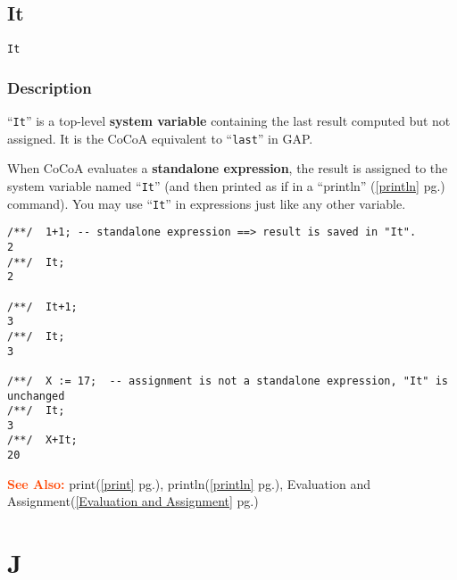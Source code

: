 \documentclass[a4paper]{mybook}
\newenvironment{command}{}{} %
\newcommand\SeeAlso{\par\textcolor{OrangeRed}{\textbf{\large See Also: }}}
\begin{document}
\section{It}
\label{It}
\begin{command} %


\begin{Verbatim}[label=syntax, rulecolor=\color{MidnightBlue},
frame=single]
It
\end{Verbatim}


\subsection*{Description}

``\verb&It&'' is a top-level \textbf{system variable} containing the last result computed
but not assigned.  It is the CoCoA equivalent to ``\verb&last&'' in GAP.
\par 
When CoCoA evaluates a \textbf{standalone expression}, the result is assigned to
the system variable named ``\verb&It&'' (and then printed as if in a ``println'' (\ref{println} pg.\pageref{println})
command).  You may use ``\verb&It&'' in expressions just like any other variable.
\begin{Verbatim}[label=example, rulecolor=\color{PineGreen}, frame=single]
/**/  1+1; -- standalone expression ==> result is saved in "It".
2
/**/  It;
2

/**/  It+1;
3
/**/  It;
3

/**/  X := 17;  -- assignment is not a standalone expression, "It" is unchanged
/**/  It;
3
/**/  X+It;
20
\end{Verbatim}


\SeeAlso %
  print(\ref{print} pg.\pageref{print}), 
    println(\ref{println} pg.\pageref{println}), 
    Evaluation and Assignment(\ref{Evaluation and Assignment} pg.\pageref{Evaluation and Assignment})
\end{command} %

\chapter{J}  %
\label{J}
\end{document}
